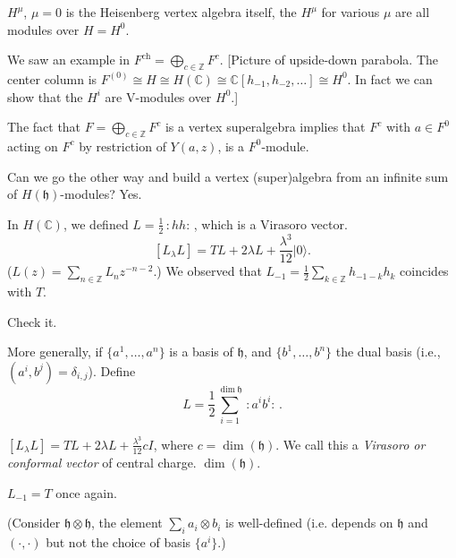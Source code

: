$H^\mu$, $\mu=0$ is the Heisenberg vertex
algebra itself,
the $H^\mu$ for various $\mu$ are all modules
over $H=H^0$.

We saw an example in
$F^{\text{ch}}=\bigoplus_{c \in
\mathbb{Z}}F^c$.
[Picture of upside-down parabola.
The center column is
 $F^{(0)}\cong H \cong H(\mathbb{C})\cong
 \mathbb{C}[h_{-1},h_{-2},\ldots]
\cong H^0$.
In fact we can show that the $H^i$ are
V-modules
over $H^0$.]

\begin{remark}
\label{remark-super}
The fact that $F= \bigoplus_{c \in
\mathbb{Z}}F^c$ is
a vertex superalgebra implies that $F^c$ with
$a \in F^0$ acting on $F^c$
by restriction of $Y(a,z)$, is a
$F^0$-module.
\end{remark}

\noindent
Can we go the other way and build a vertex
(super)algebra from an infinite sum of
$H(\mathfrak{h})$-modules? Yes.

\begin{remark}[Technical]
\label{remark-technical}
In $H(\mathbb{C})$, we defined
$L=\frac{1}{2}\,:\!hh\!:\,$,
which is a Virasoro vector.
$$
[L_\lambda L]=TL+2\lambda L
+\frac{\lambda^3}{12}|0\rangle.
$$
($L(z)=\sum_{n \in \mathbb{Z}}L_nz^{-n-2}$.)
We observed that $L_{-1}=\frac{1}{2}\sum_{k
\in \mathbb{Z}}h_{-1-k}h_k$
coincides with $T$.
\end{remark}

\begin{exercise}
\label{exercise-check-it}
Check it.
\end{exercise}

\noindent
More generally, if $\{a^1,\ldots,a^n\}$ is a
basis of $\mathfrak{h}$,
and $\{b^1,\ldots,b^n\}$ the dual basis
(i.e., $(a^i,b^j)=\delta_{i,j}$).
Define
$$
L=\frac{1}{2}\sum_{i=1}^{\dim
\mathfrak{h}}\,:\!a^ib^i\!:\,.
$$

\begin{exercise}
\label{exercise-virasoro-vector}
$[L_\lambda L]=TL+2\lambda
L+\frac{\lambda^3}{12}cI$,
where $c=\dim(\mathfrak{h})$. We call this
a {\it Virasoro or conformal vector} of
central charge.
$\dim (\mathfrak{h})$.
\end{exercise}

\begin{exercise}
\label{exercise-once-again}
$L_{-1}=T$ once again.
\end{exercise}

\noindent
(Consider $\mathfrak{h} \otimes
\mathfrak{h}$, the element
$\sum_i a_i \otimes b_i$ is well-defined
(i.e. depends on $\mathfrak{h}$ and
$(\cdot,\cdot)$
but not the choice of basis $\{a^i\}$.)

